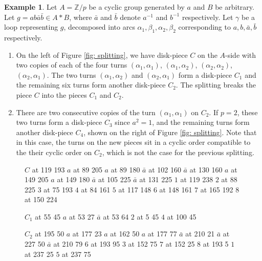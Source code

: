 \documentclass{amsart}
\theoremstyle{definition}
\newtheorem{example}[theorem]{Example}
\numberwithin{equation}{section}
\theoremstyle{theorem}
\theoremstyle{remark}
\def\Z{\mathbb Z}
\begin{document}
	\begin{example}\label{example: splitting}
	    Let $A=\Z/p$ be a cyclic group generated by $a$ and  $B$ be arbitrary. Let $g=ab\bar{a}\bar{b}\in A*B$, where $\bar{a}$ and $\bar{b}$ denote $a^{-1}$ and $b^{-1}$ respectively. 
	    Let $\gamma$ be a loop representing $g$, decomposed into arcs $\alpha_1,\beta_1,\alpha_2,\beta_2$ corresponding to $a,b, \bar{a},\bar{b}$ respectively. 
	    \begin{enumerate}
	        \item On the left of Figure \ref{fig: splitting}, we have disk-piece $C$ on the $A$-side with two copies of each of the four turns $(\alpha_1,\alpha_1)$, $(\alpha_1,\alpha_2)$, $(\alpha_2,\alpha_2)$, $(\alpha_2,\alpha_1)$. The two turns $(\alpha_1,\alpha_2)$ and $(\alpha_2,\alpha_1)$ form a disk-piece $C_1$ and the remaining six turns form another disk-piece $C_2$. The splitting breaks the piece $C$ into the pieces $C_1$ and $C_2$.\label{item: wild splitting}
	        \item There are two consecutive copies of the turn $(\alpha_1,\alpha_1)$ on $C_2$. If $p=2$, these two turns form a disk-piece $C_3$ since $a^2=1$, and the remaining turns form another disk-piece $C_4$, shown on the right of Figure \ref{fig: splitting}. Note that in this case, the turns on the new pieces sit in a cyclic order compatible to the their cyclic order on $C_2$, which is not the case for the previous splitting.\label{item: geom splitting}
	    \end{enumerate}
	    
	    \begin{figure}
		\centering
		\small \hair 2pt
		\pinlabel $C$ at 119 193
		\pinlabel $a$ at 89 205
		\pinlabel $a$ at 89 180
		\pinlabel $\bar{a}$ at 102 160
		\pinlabel $\bar{a}$ at 130 160
		\pinlabel $a$ at 149 205
		\pinlabel $a$ at 149 180
		\pinlabel $\bar{a}$ at 105 225
		\pinlabel $\bar{a}$ at 131 225
		\pinlabel $1$ at 119 238
		\pinlabel $2$ at 88 225
		\pinlabel $3$ at 75 193
		\pinlabel $4$ at 84 161
		\pinlabel $5$ at 117 148
		\pinlabel $6$ at 148 161
		\pinlabel $7$ at 165 192
		\pinlabel $8$ at 150 224
		
		\pinlabel $C_1$ at 55 45
		\pinlabel $a$ at 53 27
		\pinlabel $\bar{a}$ at 53 64
		\pinlabel $2$ at 5 45
		\pinlabel $4$ at 100 45
		
		\pinlabel $C_2$ at 195 50
		\pinlabel $a$ at 177 23
		\pinlabel $a$ at 162 50
		\pinlabel $a$ at 177 77
		\pinlabel $\bar{a}$ at 210 21
		\pinlabel $\bar{a}$ at 227 50
		\pinlabel $\bar{a}$ at 210 79
		\pinlabel $6$ at 193 95
		\pinlabel $3$ at 152 75
		\pinlabel $7$ at 152 25
		\pinlabel $8$ at 193 5
		\pinlabel $1$ at 237 25
		\pinlabel $5$ at 237 75
		

\end{figure}
\end{example}
\end{document}
